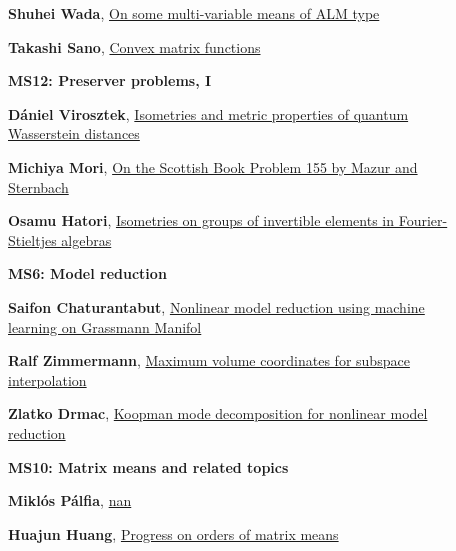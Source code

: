 \documentclass[ILAS2025-program.tex]{subfiles}
\begin{document}
\begin{description}
\begin{description}
        \item[] \hypertarget{up0124}{}\textbf{Shuhei Wada}, \hyperlink{down0124}{On some multi-variable means of ALM type}
        \item[] \hypertarget{up0125}{}\textbf{Takashi Sano}, \hyperlink{down0125}{Convex matrix functions}
        \end{description}
    \begin{description}
    \item[] {\color{mstitle}\textbf{MS12: Preserver problems, I}} 
    \item[] \hypertarget{up0126}{}\textbf{Dániel Virosztek}, \hyperlink{down0126}{Isometries and metric properties of quantum Wasserstein distances}
        \item[] \hypertarget{up0127}{}\textbf{Michiya Mori}, \hyperlink{down0127}{On the Scottish Book Problem 155 by Mazur and Sternbach}
        \item[] \hypertarget{up0128}{}\textbf{Osamu Hatori}, \hyperlink{down0128}{Isometries on groups of invertible elements in Fourier-Stieltjes algebras}
        \end{description}
    \begin{description}
    \item[] {\color{mstitle}\textbf{MS6: Model reduction}} 
    \item[] \hypertarget{up0129}{}\textbf{Saifon Chaturantabut}, \hyperlink{down0129}{Nonlinear model reduction using machine learning on Grassmann Manifol}
        \item[] \hypertarget{up0130}{}\textbf{Ralf Zimmermann}, \hyperlink{down0130}{Maximum volume coordinates for subspace interpolation}
        \item[] \hypertarget{up0131}{}\textbf{Zlatko Drmac}, \hyperlink{down0131}{Koopman mode decomposition for nonlinear model reduction}
        \end{description}
    \begin{description}
    \item[] {\color{mstitle}\textbf{MS10: Matrix means and related topics}} 
    \item[] \hypertarget{up0132}{}\textbf{Miklós Pálfia}, \hyperlink{down0132}{nan}
        \item[] \hypertarget{up0133}{}\textbf{Huajun Huang}, \hyperlink{down0133}{Progress on orders of matrix means}

\end{description}
\end{description}
\end{document}
